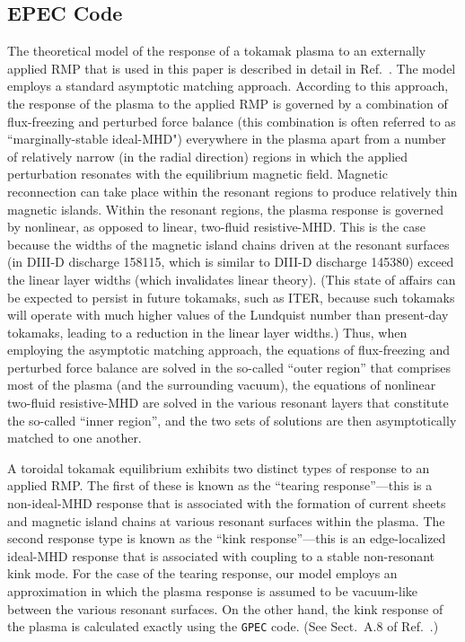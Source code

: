 \documentclass[12pt,prb,aps]{revtex4-1}
\begin{document}
\subsection{EPEC Code}
The theoretical model of the response of a tokamak plasma to an externally applied RMP that is used in this
paper is described in detail in Ref.~. The model employs a standard asymptotic matching approach.\cite{fkr,coppi,ruth,ara,pletz,am1,pletz1,tokuda,brennan,fura,am2,am3}
According to this approach, the response of the plasma to the applied RMP is governed by a combination of flux-freezing and
perturbed force balance (this combination is often referred to as ``marginally-stable ideal-MHD") everywhere in the plasma apart from a number of relatively narrow (in the radial direction) regions in which the applied
perturbation resonates with the equilibrium magnetic field. Magnetic reconnection can take place within the resonant regions to
produce relatively thin magnetic islands. Within the resonant regions, the plasma response is governed by nonlinear,
as opposed to linear, two-fluid resistive-MHD. This is the case because the widths of the magnetic island chains
driven at the resonant surfaces (in DIII-D discharge 158115,\cite{rf1} which is similar to DIII-D discharge 145380) exceed the linear layer widths (which invalidates linear theory).
(This state of affairs can be expected to persist in future tokamaks, such as ITER, because such tokamaks will operate with much higher values of the
Lundquist number than present-day tokamaks, leading to a reduction in the linear layer widths.)
Thus, when employing the asymptotic matching approach, the equations of flux-freezing and perturbed force balance
are solved in the so-called ``outer region'' that comprises most of the plasma (and the surrounding vacuum), the equations of 
nonlinear two-fluid resistive-MHD are solved in the various resonant layers that constitute the so-called ``inner region'', and the two
sets of solutions are then asymptotically matched to one another. 

A toroidal tokamak equilibrium exhibits two distinct types of response to an applied RMP.\cite{paz,kink0,kink1}
The first of these is known as the ``tearing response''---this is a non-ideal-MHD response that is associated with the
formation of current sheets and magnetic island chains at various resonant surfaces within the plasma. The second
response type is known as the ``kink response''---this is an edge-localized ideal-MHD response that is associated
with coupling to a stable non-resonant kink mode. For the case of the tearing response, our model employs an
approximation in which the plasma response is assumed to be vacuum-like between the various resonant surfaces. On the other hand,
the kink response of the plasma is calculated exactly using the {\tt GPEC} code.\cite{ipec,gpec} (See Sect.~A.8 of Ref.~.)
\end{document}
